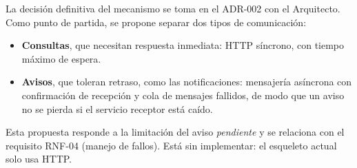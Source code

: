 La decisión definitiva del mecanismo se toma en el ADR-002 con el Arquitecto. Como punto de partida, se propone separar dos tipos de comunicación:

\begin{itemize}[leftmargin=*]
  \item \textbf{Consultas}, que necesitan respuesta inmediata: HTTP síncrono, con tiempo máximo de espera.
  \item \textbf{Avisos}, que toleran retraso, como las notificaciones: mensajería asíncrona con confirmación de recepción y cola de mensajes fallidos, de modo que un aviso no se pierda si el servicio receptor está caído.
\end{itemize}

Esta propuesta responde a la limitación del aviso \emph{pendiente} y se relaciona con el requisito RNF-04 (manejo de fallos). Está sin implementar: el esqueleto actual solo usa HTTP.
